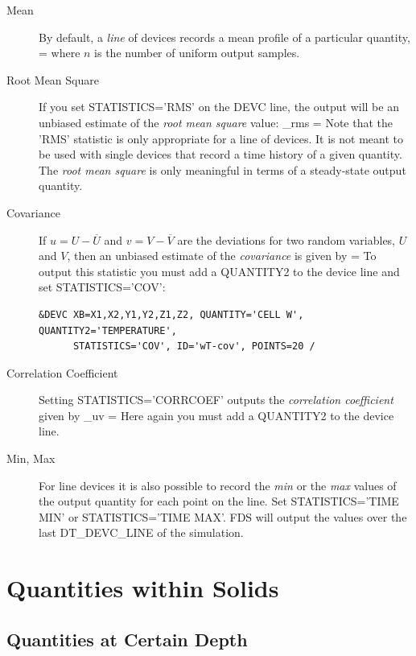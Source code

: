 \documentclass[11pt]{book}
\begin{document}
\begin{description}
\item[Mean] By default, a {\em line} of devices records a mean profile of a particular quantity,
\be
   \overline{\phi} = 
\ee
where $n$ is the number of uniform output samples.
\item[Root Mean Square] If you set {\ct STATISTICS='RMS'} on the {\ct DEVC} line, the output will be an unbiased estimate of the {\em root mean square} value:
\be
   \phi_{\rm rms} = 
\ee
Note that the {\ct 'RMS'} statistic is only appropriate for a line of devices. It is not meant to be used with single devices that record a time history of a given quantity. The {\em root mean square} is only meaningful in terms of a steady-state output quantity.
\item[Covariance] If $u = U - \overline{U}$ and $v= V-\overline{V}$ are the deviations for two random variables, $U$ and $V$, then an unbiased estimate of the \emph{covariance} is given by
\be
    = 
\ee
To output this statistic you must add a {\ct QUANTITY2} to the device line and set {\ct STATISTICS='COV'}:
\begin{lstlisting}
&DEVC XB=X1,X2,Y1,Y2,Z1,Z2, QUANTITY='CELL W', QUANTITY2='TEMPERATURE',
      STATISTICS='COV', ID='wT-cov', POINTS=20 /
\end{lstlisting}
\item[Correlation Coefficient] Setting {\ct STATISTICS='CORRCOEF'} outputs the \emph{correlation coefficient} given by
\be
   \rho_{uv} = 
\ee
Here again you must add a {\ct QUANTITY2} to the device line.
\item[Min, Max] For line devices it is also possible to record the \emph{min} or the \emph{max} values of the output quantity for each point on the line.  Set {\ct STATISTICS='TIME MIN'} or {\ct STATISTICS='TIME MAX'}.  FDS will output the values over the last {\ct DT\_DEVC\_LINE} of the simulation.
\end{description}






\section{Quantities within Solids}

\subsection{Quantities at Certain Depth}
\label{info:DEPTH}
\end{document}

